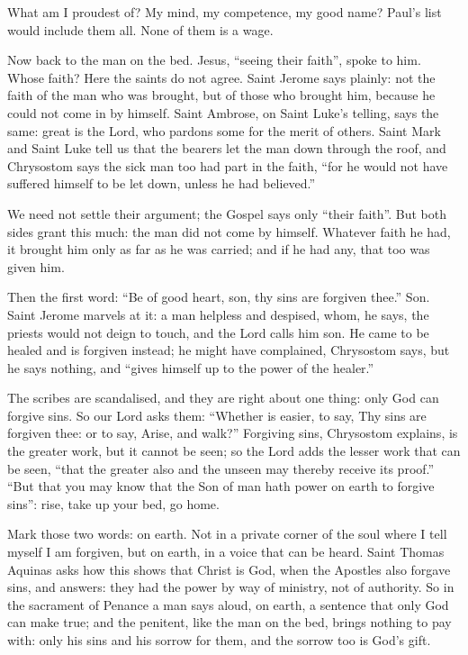 What am I proudest of? My mind, my competence, my good name? Paul's list would
include them all. None of them is a wage.

\bigskip

Now back to the man on the bed. Jesus, ``seeing their faith'', spoke to him.
Whose faith? Here the saints do not agree. Saint Jerome says plainly: not the
faith of the man who was brought, but of those who brought him, because he
could not come in by himself. Saint Ambrose, on Saint Luke's telling, says the
same: great is the Lord, who pardons some for the merit of others. Saint Mark
and Saint Luke tell us that the bearers let the man down through the roof, and
Chrysostom says the sick man too had part in the faith, ``for he would not
have suffered himself to be let down, unless he had believed.''

We need not settle their argument; the Gospel says only ``their faith''. But
both sides grant this much: the man did not come by himself. Whatever faith he
had, it brought him only as far as he was carried; and if he had any, that too
was given him.

Then the first word: ``Be of good heart, son, thy sins are forgiven thee.''
Son. Saint Jerome marvels at it: a man helpless and despised, whom, he says,
the priests would not deign to touch, and the Lord calls him son. He came to
be healed and is forgiven instead; he might have complained, Chrysostom says,
but he says nothing, and ``gives himself up to the power of the healer.''

\bigskip

The scribes are scandalised, and they are right about one thing: only God can
forgive sins. So our Lord asks them: ``Whether is easier, to say, Thy sins are
forgiven thee: or to say, Arise, and walk?'' Forgiving sins, Chrysostom
explains, is the greater work, but it cannot be seen; so the Lord adds the
lesser work that can be seen, ``that the greater also and the unseen may
thereby receive its proof.'' ``But that you may know that the Son of man hath
power on earth to forgive sins'': rise, take up your bed, go home.

Mark those two words: on earth. Not in a private corner of the soul where I
tell myself I am forgiven, but on earth, in a voice that can be heard. Saint
Thomas Aquinas asks how this shows that Christ is God, when the Apostles also
forgave sins, and answers: they had the power by way of ministry, not of
authority. So in the sacrament of Penance a man says aloud, on earth, a
sentence that only God can make true; and the penitent, like the man on the
bed, brings nothing to pay with: only his sins and his sorrow for them, and
the sorrow too is God's gift.

